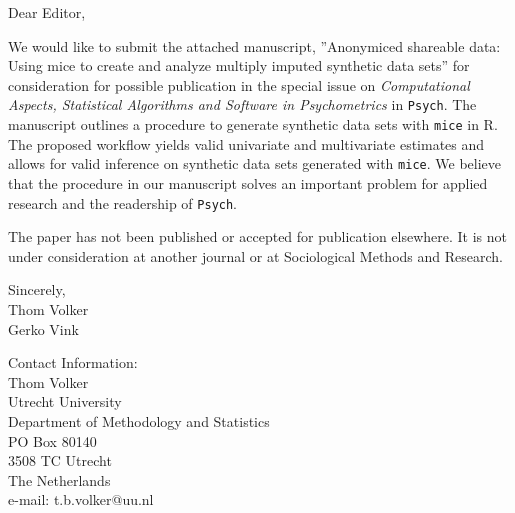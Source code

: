  
 \pagestyle{empty}

Dear Editor,\\
\newline

We would like to submit the attached manuscript, ”Anonymiced shareable data: Using mice to create and analyze multiply imputed synthetic data sets” for consideration for possible publication in the special issue on \emph{Computational Aspects, Statistical Algorithms and Software in Psychometrics} in \texttt{Psych}. The manuscript outlines a procedure to generate synthetic data sets with \texttt{mice} in {R}. The proposed workflow yields valid univariate and multivariate estimates and allows for valid inference on synthetic data sets generated with \texttt{mice}. We believe that the procedure in our manuscript solves an important problem for applied research and the readership of \texttt{Psych}.

The paper has not been published or accepted for publication elsewhere. It is not under consideration at another journal or at Sociological Methods and Research.

Sincerely, 
\newline\\  
Thom Volker\\
Gerko Vink\\
\newline


Contact Information:\\
Thom Volker\\
Utrecht University\\
Department of Methodology and Statistics\\
PO Box 80140\\
3508 TC Utrecht\\
The Netherlands\\
e-mail: t.b.volker@uu.nl\\

 
